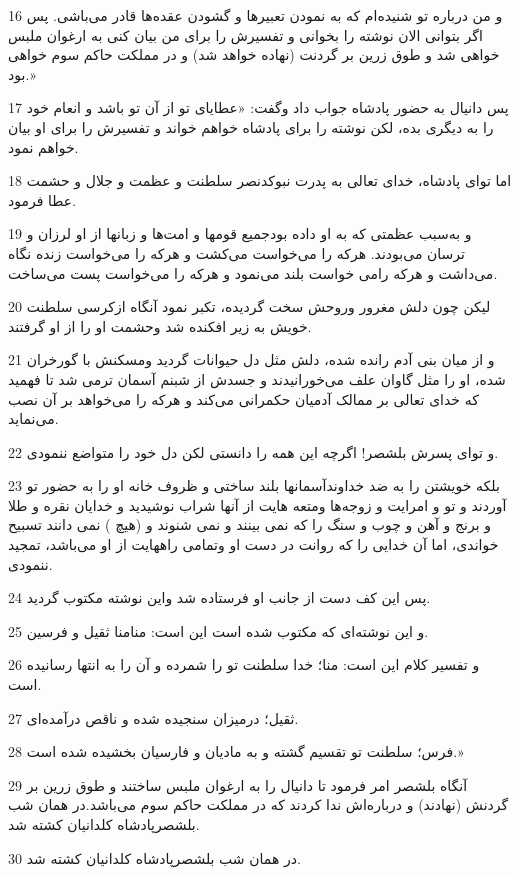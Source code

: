 \par 16 و من درباره تو شنیده‌ام که به نمودن تعبیرها و گشودن عقده‌ها قادر می‌باشی. پس اگر بتوانی الان نوشته را بخوانی و تفسیرش را برای من بیان کنی به ارغوان ملبس خواهی شد و طوق زرین بر گردنت (نهاده خواهد شد) و در مملکت حاکم سوم خواهی بود.»
\par 17 پس دانیال به حضور پادشاه جواب داد وگفت: «عطایای تو از آن تو باشد و انعام خود را به دیگری بده، لکن نوشته را برای پادشاه خواهم خواند و تفسیرش را برای او بیان خواهم نمود.
\par 18 اما تو‌ای پادشاه، خدای تعالی به پدرت نبوکدنصر سلطنت و عظمت و جلال و حشمت عطا فرمود.
\par 19 و به‌سبب عظمتی که به او داده بودجمیع قومها و امت‌ها و زبانها از او لرزان و ترسان می‌بودند. هر‌که را می‌خواست می‌کشت و هر‌که را می‌خواست زنده نگاه می‌داشت و هر‌که رامی خواست بلند می‌نمود و هر‌که را می‌خواست پست می‌ساخت.
\par 20 لیکن چون دلش مغرور وروحش سخت گردیده، تکبر نمود آنگاه ازکرسی سلطنت خویش به زیر افکنده شد وحشمت او را از او گرفتند.
\par 21 و از میان بنی آدم رانده شده، دلش مثل دل حیوانات گردید ومسکنش با گورخران شده، او را مثل گاوان علف می‌خورانیدند و جسدش از شبنم آسمان ترمی شد تا فهمید که خدای تعالی بر ممالک آدمیان حکمرانی می‌کند و هر‌که را می‌خواهد بر آن نصب می‌نماید.
\par 22 و تو‌ای پسرش بلشصر! اگرچه این همه را دانستی لکن دل خود را متواضع ننمودی.
\par 23 بلکه خویشتن را به ضد خداوندآسمانها بلند ساختی و ظروف خانه او را به حضور تو آوردند و تو و امرایت و زوجه‌ها ومتعه هایت از آنها شراب نوشیدید و خدایان نقره و طلا و برنج و آهن و چوب و سنگ را که نمی بینند و نمی شنوند و (هیچ ) نمی دانند تسبیح خواندی، اما آن خدایی را که روانت در دست او وتمامی راههایت از او می‌باشد، تمجید ننمودی.
\par 24 پس این کف دست از جانب او فرستاده شد واین نوشته مکتوب گردید.
\par 25 و این نوشته‌ای که مکتوب شده است این است: منامنا ثقیل و فرسین.
\par 26 و تفسیر کلام این است: منا؛ خدا سلطنت تو را شمرده و آن را به انتها رسانیده است.
\par 27 ثقیل؛ درمیزان سنجیده شده و ناقص درآمده‌ای.
\par 28 فرس؛ سلطنت تو تقسیم گشته و به مادیان و فارسیان بخشیده شده است.»
\par 29 آنگاه بلشصر امر فرمود تا دانیال را به ارغوان ملبس ساختند و طوق زرین بر گردنش (نهادند) و درباره‌اش ندا کردند که در مملکت حاکم سوم می‌باشد.در همان شب بلشصرپادشاه کلدانیان کشته شد.
\par 30 در همان شب بلشصرپادشاه کلدانیان کشته شد.

